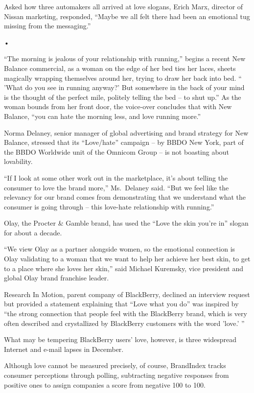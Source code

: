 ﻿\documentclass[12pt]{article}
\begin{document}
Asked how three automakers all arrived at love slogans, Erich Marx, director of Nissan marketing,
responded, ``Maybe we all felt there had been an emotional tug missing from the messaging.''

•

``The morning is jealous of your relationship with running,'' begins a recent New Balance
commercial, as a woman on the edge of her bed ties her laces, sheets magically wrapping themselves
around her, trying to draw her back into bed. `` 'What do you see in running anyway?' But somewhere
in the back of your mind is the thought of the perfect mile, politely telling the bed -- to shut
up.'' As the woman bounds from her front door, the voice-over concludes that with New Balance, ``you
can hate the morning less, and love running more.''

Norma Delaney, senior manager of global advertising and brand strategy for New Balance, stressed
that its ``Love/hate'' campaign -- by BBDO New York, part of the BBDO Worldwide unit of the Omnicom
Group -- is not boasting about lovability.

``If I look at some other work out in the marketplace, it's about telling the consumer to love the
brand more,'' Ms.~Delaney said. ``But we feel like the relevancy for our brand comes from
demonstrating that we understand what the consumer is going through -- this love-hate relationship
with running.''

Olay, the Procter \& Gamble brand, has used the ``Love the skin you're in'' slogan for about a
decade.

``We view Olay as a partner alongside women, so the emotional connection is Olay validating to a
woman that we want to help her achieve her best skin, to get to a place where she loves her skin,''
said Michael Kuremsky, vice president and global Olay brand franchise leader.

Research In Motion, parent company of BlackBerry, declined an interview request but provided a
statement explaining that ``Love what you do'' was inspired by ``the strong connection that people
feel with the BlackBerry brand, which is very often described and crystallized by BlackBerry
customers with the word 'love.' ''

What may be tempering BlackBerry users' love, however, is three widespread Internet and e-mail
lapses in December.

Although love cannot be measured precisely, of course, BrandIndex tracks consumer perceptions
through polling, subtracting negative responses from positive ones to assign companies a score from
negative 100 to 100.
\end{document}
